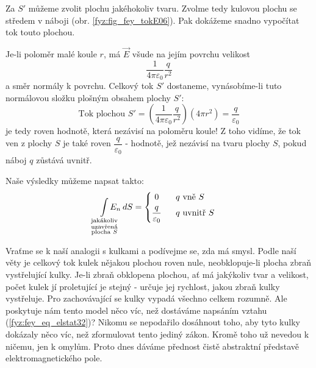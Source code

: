     Za \(S'\) můžeme zvolit plochu jakéhokoliv tvaru. Zvolme tedy kulovou plochu se středem v náboji 
    (obr. \ref{fyz:fig_fey_tokE06}). Pak dokážeme snadno vypočítat tok touto plochou. 
        
    Je-li poloměr malé koule \(r\), má \(\vec{E}\) všude na jejím povrchu velikost
    \begin{equation*}
      \frac{1}{4\pi\varepsilon_0}\frac{q}{r^2}
    \end{equation*}
    a směr normály k povrchu. Celkový tok \(S'\) dostaneme, vynásobíme-li tuto normálovou složku 
    plošným obsahem plochy \(S'\):
    \begin{equation} \label{fyz:fey_eq_elstat31}
      \text{Tok plochou } S' = \left(\frac{1}{4\pi\varepsilon_0}\frac{q}{r^2}\right)(4\pi r^2)  
                             = \frac{q}{\varepsilon_0}
    \end{equation}
    je tedy roven hodnotě, která nezávisí na poloměru koule! Z toho vidíme, že tok ven z plochy 
    \(S\) je také roven \(\dfrac{q}{\varepsilon_0}\) - hodnotě, jež nezávisí na tvaru plochy \(S\), 
    pokud náboj \(q\) zůstává uvnitř.
    
    Naše výsledky můžeme napsat takto:
    \begin{equation}\label{fyz:fey_eq_elstat32}
      \limitint_{\mathclap{\substack{\text{jakákoliv}\\\text{uzavřená}\\\text{plocha }S}}} E_n\dd{S} = 
        \begin{dcases*}
           0                       & \(q\) vně \(S\) \\
           \frac{q}{\varepsilon_0} & \(q\) uvnitř \(S\)
        \end{dcases*}          
    \end{equation} 
        
    Vraťme se k naší analogii s kulkami a podívejme se, zda má smysl. Podle naší věty je celkový tok 
    kulek nějakou plochou roven nule, neobklopuje-li plocha zbraň vystřelující kulky. Je-li zbraň 
    obklopena plochou, ať má jakýkoliv tvar a velikost, počet kulek jí proletující je stejný - 
    určuje jej rychlost, jakou zbraň kulky vystřeluje. Pro zachovávající se kulky vypadá všechno 
    celkem rozumně. Ale poskytuje nám tento model něco víc, než dostáváme napsáním vztahu 
    (\ref{fyz:fey_eq_elstat32})? Nikomu se nepodařilo dosáhnout toho, aby tyto kulky dokázaly něco 
    víc, než zformulovat tento jediný zákon. Kromě toho už nevedou k ničemu, jen k omylům. Proto 
    dnes dáváme přednost čistě abstraktní představě elektromagnetického pole.

